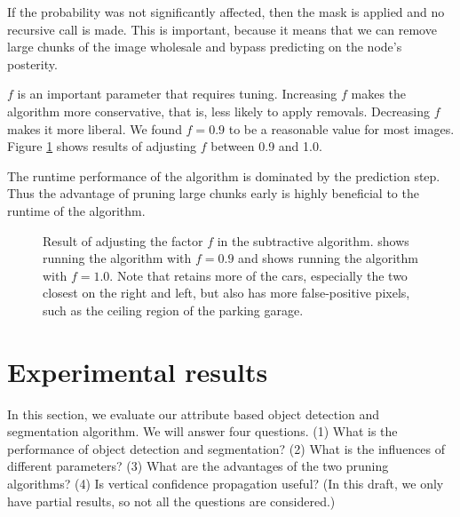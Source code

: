 \documentclass[10pt,twocolumn,letterpaper]{article}
\begin{document}
If the probability was not significantly affected, then the mask is applied
and no recursive call is made.  This is important, because it means
that we can remove large chunks of the image wholesale and bypass predicting
on the node's posterity.

$f$ is an important parameter that requires tuning.  Increasing $f$ makes the
algorithm more conservative, that is, less likely to apply removals.  Decreasing
$f$ makes it more liberal.  We found $f=0.9$ to be a reasonable value for most images.
Figure \ref{fig:f} shows results of adjusting $f$ between 0.9 and 1.0.

The runtime performance of the algorithm is dominated by the prediction step.
Thus the advantage of pruning large chunks early is highly beneficial to
the runtime of the algorithm.

\begin{figure}
\centering
{}
 \caption{Result of adjusting the factor $f$ in the subtractive
algorithm.  shows running the algorithm with $f=0.9$
and  shows running the algorithm with $f=1.0$.  Note
that  retains more of the cars, especially the two
closest on the right and left, but also has more false-positive
pixels, such as the ceiling region of the parking garage.}
\label{fig:f}
\end{figure}

\section{Experimental results}
\label{sec:results}

In this section, we evaluate our attribute based object detection
and segmentation algorithm. We will answer four questions. (1) What
is the performance of object detection and segmentation? (2) What is
the influences of different parameters? (3) What are the advantages
of the two pruning algorithms? (4) Is vertical confidence
propagation useful? (In this draft, we only have partial results, so
not all the questions are considered.)
\end{document}
